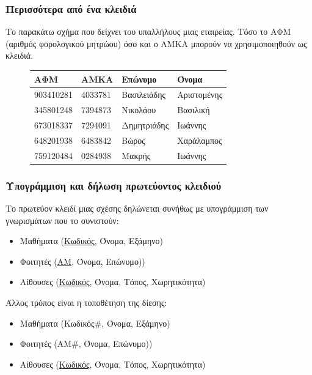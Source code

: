 \begin{frame}
\frametitle{Περισσότερα από ένα κλειδιά}
\begin{minipage}{0.94\textwidth}
Το παρακάτω σχήμα που δείχνει του υπαλλήλους
μιας εταιρείας.
Τόσο το ΑΦΜ (αριθμός φορολογικού μητρώου) όσο και ο ΑΜΚΑ
μπορούν να χρησιμοποιηθούν ως κλειδιά.
\begin{figure}[h]
  \begin{tabular}{ l l l l } \toprule
    {\bf ΑΦΜ} & {\bf ΑΜΚΑ} & {\bf Επώνυμο} & {\bf Όνομα} \\ \midrule
    903410281 & 4033781 & Βασιλειάδης & Αριστομένης \\
    345801248 & 7394873 & Νικολάου & Βασιλική \\
    673018337 & 7294091 & Δημητριάδης & Ιωάννης \\
    648201938 & 6483842 & Βώρος & Χαράλαμπος \\
    759120484 & 0284938 & Μακρής & Ιωάννης \\ \bottomrule
  \end{tabular}
\end{figure}
\end{minipage}
\end{frame}



\begin{frame}[t, fragile]
\frametitle{Υπογράμμιση και δήλωση πρωτεύοντος κλειδιού}
\begin{minipage}{0.94\textwidth}
  \begin{exampleblock}{Το πρωτεύον κλειδί μιας σχέσης δηλώνεται συνήθως με υπογράμμιση των γνωρισμάτων που το συνιστούν:}
    \begin{itemize}
      \item Μαθήματα (\underline{Κωδικός}, Όνομα, Εξάμηνο)
      \item Φοιτητές (\underline{ΑΜ}, Όνομα, Επώνυμο))   
      \item Αίθουσες (\underline{Κωδικός}, Όνομα, Τόπος, Χωρητικότητα)
    \end{itemize}
  \end{exampleblock}
  \begin{exampleblock}{Άλλος τρόπος είναι η τοποθέτηση της δίεσης:}
    \begin{itemize}
      \item Μαθήματα (Κωδικός$\#$, Όνομα, Εξάμηνο)
      \item Φοιτητές (ΑΜ$\#$, Όνομα, Επώνυμο))   
      \item Αίθουσες (\underline{Κωδικός}, Όνομα, Τόπος, Χωρητικότητα)
    \end{itemize} 
  \end{exampleblock}
\end{minipage} 
\end{frame}


